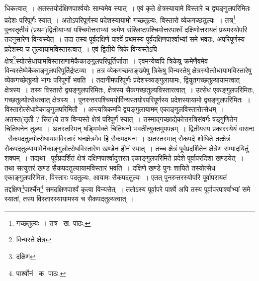 \documentclass[11pt, openany]{book}
\begin{document}
\newpage
\begin{sloppypar} 
\noindent धिकत्वात्~। अतस्तयोर्दक्षिणपार्श्वयोः साम्यमेव स्यात्~। एवं कृते क्षेत्रस्यायामे विस्तारे च द्व्यङ्गुलपरिमितः प्रदेशः परिपूर्णः स्यात्~।
अतोऽपरिपूर्णस्य प्रदेशस्यायामो गच्छतुल्यः, विस्तारो व्येकगच्छतुल्यः~। तत्र\renewcommand{\thefootnote}{१}\footnote{गच्छतुल्यः~। तत्र \textendash\ ख. पाठः.} पुनस्तृतीयं (प्रथम)द्वितीयाभ्यां पश्चिमोत्तराभ्यां क्रमेण संश्लिष्टपश्चिमोत्तरपार्श्वं दक्षिणोत्तरायतं प्रथमस्योपरि तदनुसारेण विन्यस्येत्~। तदा तस्य पूर्वदक्षिणे पार्श्वे प्रथमस्य पूर्वदक्षिणपार्श्वाभ्यां समे भवतः, अपरिपूर्णस्य प्रदेशस्य च तुल्यायामविस्तारत्वात्~। एवं द्वितीये त्रिके विन्यस्तेऽपि क्षेत्र\renewcommand{\thefootnote}{२}\footnote{विन्यस्ते क्षेत्र}स्योत्सेधायामविस्ताराणामेकैकाङ्गुलपरिपूर्तिर्जाता~। एवमन्येष्वपि त्रिकेषु क्रमेणैवमेव विन्यस्तेष्वेकैकाङ्गुलपरिपूर्तिर्द्रष्टव्या~। तत्र व्येकगच्छसङ्ख्येषु त्रिकेषु विन्यस्तेषु क्षेत्रस्योत्सेधायामविस्तारेषु व्येकगच्छेतुल्यो भागः परिपूर्णो भवति~। तदानीमपरिपूर्णः प्रदेशस्त्र्यङ्गुलायामः, द्वियुतगच्छतुल्यायामत्वात् क्षेत्रस्य~। तस्य विस्तारो द्व्यङ्गुलपरिमितः, क्षेत्रस्य सैकगच्छतुल्यविस्तारत्वात्~। उत्सेध एकङ्गुलपरिमितः, गच्छतुल्योत्सेधत्वात् क्षेत्रस्य~। पुनरुत्तरपश्चिमयोर्विन्यस्तयोरपरिपूर्णस्य प्रदेशस्यायामो द्व्यङ्गुलपरिमितः~। विस्तारोत्सेधावेकाङ्गुलपरिमितौ~। अन्त्यत्रिकमपि द्व्यङ्गुलायामम् एकाङ्गुलविस्तारोत्सेधम्~। अतस्त(त्तृती ? त्त्रित)ये तत्र विन्यस्ते क्षेत्रं परिपूर्णं स्यात्~। तस्माद्गच्छाद्येकोत्तरत्रिसंवर्गः षड्गुणितेन चितिघनेन तुल्यः~। अतस्तस्मिन् षड्भिर्भक्ते चितिघनो भवतीत्युक्तमुपपन्नम्~। द्वितीयस्य प्रकारस्येयं वासना \textendash\ सैकपदतुल्योत्सेधायामविस्तारं घनक्षेत्रमेव हि सैकपदघनः~। अतस्तस्मात् सैकपदे शोधिते तत्क्षेत्रं सैकपदतुल्यायामेनैकाङ्गुलोत्सेधविस्तारेण खण्डेन हीनं स्यात्~। तच्च क्षेत्रं पूर्वप्रदर्शितेन क्षेत्रेण सम्पादयितुं शक्यम्~। तद्यथा \textendash\ पूर्वप्रदर्शितं क्षेत्रं दक्षिणपार्श्वादुत्तरत एकाङ्गुलपरिमिते प्रदेशे पूर्वापरदिशा खण्डयेत्~। तथा सत्युत्तरं खण्डं सैकपदतुल्यायामविस्तारं भवति~। दक्षिणे खण्डे पुनः शायिते तस्योत्सेध एकाङ्गुलपरिमितः, विस्तारः पदतुल्यः, आयामः सैकपदतुल्यः~। एतत् पुनरुत्तरस्योपरि पूर्वापरायतं तद्दक्षिण\renewcommand{\thefootnote}{३}\footnote{दक्षिण}पार्श्चेन\renewcommand{\thefootnote}{४}\footnote{पार्श्वोनं \textendash\ क. पाठः.} समदक्षिणपार्श्वं कृत्वा विन्यसेत्~। ततोऽस्य पूर्वापरे पार्श्वे अपि तस्य पूर्वापरपार्श्वाभ्यां समे स्यातां, तस्य विस्तारस्यायामस्य च सैकपदतुल्यत्वात्~।
\end{sloppypar} 
\newpage
\end{document}
